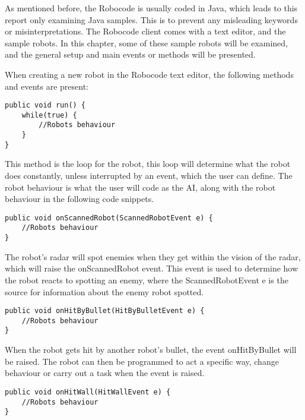As mentioned before, the Robocode is usually coded in Java, which leads to this report only examining Java samples. This is to prevent any misleading keywords or misinterpretations. The Robocode client comes with a text editor, and the sample robots. In this chapter, some of these sample robots will be examined, and the general setup and main events or methods will be presented.

When creating a new robot in the Robocode text editor, the following methods and events are present:

\begin{lstlisting}[caption={Eksampel of the main loop in Robocode} label=run, xleftmargin=.2\textwidth]
public void run() {
	while(true) {
		//Robots behaviour
	}
}
\end{lstlisting}

This method is the loop for the robot, this loop will determine what the robot does constantly, unless interrupted by an event, which the user can define. The robot behaviour is what the user will code as the AI, along with the robot behaviour in the following code snippets.

\begin{lstlisting}[caption={Eksampel of the onScannedRobot event from Robocode} label=osr, xleftmargin=.2\textwidth]
public void onScannedRobot(ScannedRobotEvent e) {
	//Robots behaviour
}
\end{lstlisting}

The robot’s radar will spot enemies when they get within the vision of the radar, which will raise the onScannedRobot event. This event is used to determine how the robot reacts to spotting an enemy, where the ScannedRobotEvent e is the source for information about the enemy robot spotted.

\begin{lstlisting}[caption={Eksampel of the onHitByBullet event from Robocode} label=ohbb, xleftmargin=.2\textwidth]
public void onHitByBullet(HitByBulletEvent e) {
	//Robots behaviour
}
\end{lstlisting}

When the robot gets hit by another robot’s bullet, the event onHitByBullet will be raised. The robot can then be programmed to act a specific way, change behaviour or carry out a task when the event is raised.

\begin{lstlisting}[caption={Eksampel of the onHitWall event from Robocode} label=ohw, xleftmargin=.2\textwidth]
public void onHitWall(HitWallEvent e) {
	//Robots behaviour
}
\end{lstlisting}

